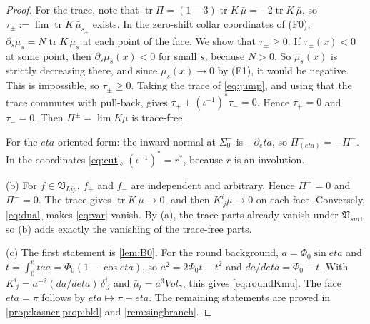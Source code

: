 \documentclass[11pt]{article}
\theoremstyle{canonmath}
\theoremstyle{canonpostulate}
\theoremstyle{canonproposition}
\theoremstyle{canonmath}
\theoremstyle{canonproposition}
\providecommand{\Vlip}{\mathfrak{V}_{\mathrm{Lip}}}
\providecommand{\Vsm}{\mathfrak{V}_{\mathrm{sm}}}
\def\mathrm#1{#1}%
\def\eta{eta}%
\begin{document}
\begin{proof}
For the trace, note that $\operatorname{tr}\Pi = (1-3)\operatorname{tr}K\,\bar\mu = -2\operatorname{tr}K\,\bar\mu$, so $\tau_\pm := \lim\operatorname{tr}K\,\bar\mu_{s_\pm}$ exists. In the zero-shift collar coordinates of (F0), $\partial_s\bar\mu_s = N\operatorname{tr}K\,\bar\mu_s$ at each point of the face. We show that $\tau_\pm\ge0$. If $\tau_\pm(x)<0$ at some point, then $\partial_s\bar\mu_s(x)<0$ for small $s$, because $N>0$. So $\bar\mu_s(x)$ is strictly decreasing there, and since $\bar\mu_s(x)\to0$ by (F1), it would be negative. This is impossible, so $\tau_\pm\ge0$. Taking the trace of \eqref{eq:jump}, and using that the trace commutes with pull-back, gives $\tau_+ + (\iota^{-1})^*\tau_- = 0$. Hence $\tau_+ = 0$ and $\tau_- = 0$. Then $\Pi^\pm = \lim K\bar\mu$ is trace-free.

For the $\eta$-oriented form: the inward normal at $\Sigma_0^-$ is $-\partial_\eta$, so $\Pi^-_{(\eta)} = -\Pi^-$. In the coordinates \eqref{eq:cut}, $(\iota^{-1})^* = r^*$, because $r$ is an involution.

(b) For $f\in\Vlip$, $f_+$ and $f_-$ are independent and arbitrary. Hence $\Pi^+ = 0$ and $\Pi^- = 0$. The trace gives $\operatorname{tr}K\,\bar\mu\to0$, and then $K^i_{\ j}\bar\mu\to0$ on each face. Conversely, \eqref{eq:dual} makes \eqref{eq:var} vanish. By (a), the trace parts already vanish under $\Vsm$, so (b) adds exactly the vanishing of the trace-free parts.

(c) The first statement is \cref{lem:B0}. For the round background, $a = \Phi_0\sin\eta$ and $t = \int_0^\eta a = \Phi_0(1-\cos\eta)$, so $a^2 = 2\Phi_0t-t^2$ and $da/d\eta = \Phi_0 - t$. With $K^i_{\ j} = a^{-2}(da/d\eta)\,\delta^i_{\ j}$ and $\bar\mu_t = a^3\mathrm{Vol}_\gamma$, this gives \eqref{eq:roundKmu}. The face $\eta=\pi$ follows by $\eta\mapsto\pi-\eta$. The remaining statements are proved in \cref{prop:kasner,prop:bkl} and \cref{rem:singbranch}.
\end{proof}
\end{document}

